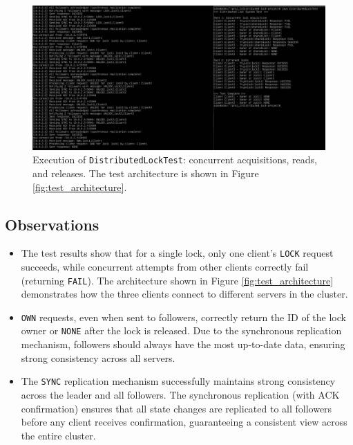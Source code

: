 \documentclass[a4paper,11pt]{article}
\begin{document}
\begin{figure}[H]
\centering
\includegraphics[width=1\linewidth]{images/Capture_distributed_lock_test.JPG}
\caption{Execution of \texttt{DistributedLockTest}: concurrent acquisitions, reads, and releases. The test architecture is shown in Figure \ref{fig:test_architecture}.}
\end{figure}


\subsection*{Observations}
\begin{itemize}
    \item The test results show that for a single lock, only one client's \texttt{LOCK} request succeeds, while concurrent attempts from other clients correctly fail (returning \texttt{FAIL}). The architecture shown in Figure \ref{fig:test_architecture} demonstrates how the three clients connect to different servers in the cluster.
    \item \texttt{OWN} requests, even when sent to followers, correctly return the ID of the lock owner or \texttt{NONE} after the lock is released. Due to the synchronous replication mechanism, followers should always have the most up-to-date data, ensuring strong consistency across all servers.
    \item The \texttt{SYNC} replication mechanism successfully maintains strong consistency across the leader and all followers. The synchronous replication (with ACK confirmation) ensures that all state changes are replicated to all followers before any client receives confirmation, guaranteeing a consistent view across the entire cluster.
\end{itemize}
\end{document}
